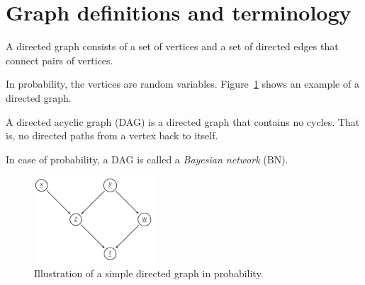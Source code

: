 \section{Graph definitions and terminology}
\begin{mydefinition}
    A directed graph consists of a set of vertices and a set of directed edges that connect pairs of vertices.

    In probability, the vertices are random variables. Figure~\ref{fig:simple_dag} shows an example of a directed graph.
\end{mydefinition}
\begin{mydefinition}
    \label{def:directed acyclic graph}
    A directed acyclic graph (DAG) is a directed graph that contains no cycles. That is, no directed paths from a vertex back to itself.

    In case of probability, a DAG is called a \emph{Bayesian network} (BN).
\end{mydefinition}

\begin{figure}[h]
    \centering
    \includegraphics[width=0.4\textwidth]{figs/Graphs/simple_dag.PNG}    
    \caption{Illustration of a simple directed graph in probability.}
    \label{fig:simple_dag}
\end{figure}

